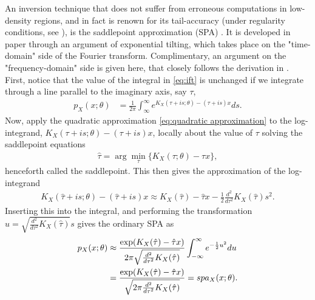 An inversion technique that does not suffer from erroneous computations in low-density regions, and in fact is renown for its tail-accuracy (under regularity conditions, see \citet{barndorff1999tail}), is the saddlepoint approximation (SPA) \citep{daniels1954saddlepoint}.
It is developed in paper  through an argument of exponential tilting, which takes place on the "time-domain" side of the Fourier transform. 
Complimentary, an argument on the "frequency-domain" side is given here, that closely follows the derivation in \citet{butler2007saddlepoint}.
First, notice that the value of the integral in \eqref{eq:ift} is unchanged if we integrate through a line parallel to the imaginary axis, say $\tau$,
\begin{align}
	p_X(x;\theta) 
	&= \frac{1}{2\pi} \int_{\infty}^{\infty} e^{K_X(\tau+is;\theta)-(\tau+is)x} ds.
\end{align}
Now, apply the quadratic approximation \eqref{eq:quadratic approximation} to the log-integrand,
$K_X(\tau+is;\theta)-(\tau+is)x$,
locally about the value of $\tau$ solving the saddlepoint equations
\begin{align}\label{eq:spa-inner}
	\hat{\tau}=\arg\min_\tau\{ K_X(\tau;\theta)-\tau x\},
\end{align}
henceforth called the saddlepoint.
This then gives the approximation of the log-integrand
\begin{align}
	K_X(\hat{\tau}+is;\theta)-(\hat{\tau}+is)x
	\approx 
	K_X(\hat{\tau})-\hat{\tau}x
	- \frac{1}{2}\frac{d^2}{d\tau^2}K_X(\hat{\tau})s^2.
\end{align}
Inserting this into the integral, and performing the transformation $u=\sqrt{\frac{d^2}{d\tau^2}K_X(\hat{\tau})}s$ gives the ordinary SPA as
\begin{align}\label{eq:spa}
	p_X(x;\theta) 
	&\approx
	\frac{\exp(K_X(\hat{\tau})-\hat{\tau}x)}{2\pi\sqrt{\frac{d^2}{d\tau^2}K_X(\hat{\tau})}}
	\int_{-\infty}^{\infty}e^{-\frac{1}{2}u^2}du \notag \\
	&= \frac{\exp(K_X(\hat{\tau})-\hat{\tau}x)}{\sqrt{2\pi\frac{d^2}{d\tau^2}K_X(\hat{\tau})}}
	= spa_X(x;\theta).
\end{align}

